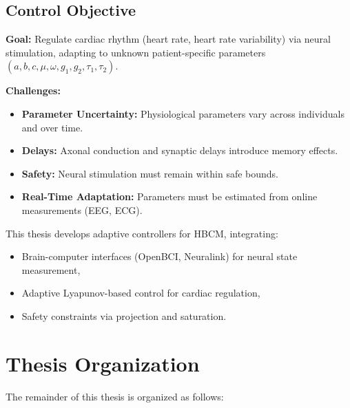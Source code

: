 \subsection{Control Objective}

\textbf{Goal:} Regulate cardiac rhythm (heart rate, heart rate variability) via neural stimulation, adapting to unknown patient-specific parameters $(a, b, c, \mu, \omega, g_1, g_2, \tau_1, \tau_2)$.

\textbf{Challenges:}
\begin{itemize}
    \item \textbf{Parameter Uncertainty:} Physiological parameters vary across individuals and over time.
    \item \textbf{Delays:} Axonal conduction and synaptic delays introduce memory effects.
    \item \textbf{Safety:} Neural stimulation must remain within safe bounds.
    \item \textbf{Real-Time Adaptation:} Parameters must be estimated from online measurements (EEG, ECG).
\end{itemize}

This thesis develops adaptive controllers for HBCM, integrating:
\begin{itemize}
    \item Brain-computer interfaces (OpenBCI, Neuralink) for neural state measurement,
    \item Adaptive Lyapunov-based control for cardiac regulation,
    \item Safety constraints via projection and saturation.
\end{itemize}

\section{Thesis Organization}

The remainder of this thesis is organized as follows:

